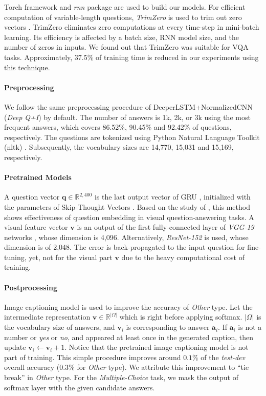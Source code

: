 \documentclass{article}
\newcommand{\vv}[0]{\mathbf{v}}
\newcommand{\vq}[0]{\mathbf{q}}
\newcommand{\va}[0]{\mathbf{a}}
\begin{document}
Torch framework and \textit{rnn} package \cite{Leonard2015a} are used to build our models. For efficient computation of variable-length questions, \textit{TrimZero} is used to trim out zero vectors \cite{Kim2016a}. TrimZero eliminates zero computations at every time-step in mini-batch learning. Its efficiency is affected by a batch size, RNN model size, and the number of zeros in inputs. We found out that TrimZero was suitable for VQA tasks. Approximately, 37.5\% of training time is reduced in our experiments using this technique.

\paragraph{Preprocessing} We follow the same preprocessing procedure of DeeperLSTM+NormalizedCNN \cite{Lu2015} (\textit{Deep Q+I}) by default. The number of answers is 1k, 2k, or 3k using the most frequent answers, which covers 86.52\%, 90.45\% and 92.42\% of questions, respectively. The questions are tokenized using Python Natural Language Toolkit (nltk) \cite{Bird2009}. Subsequently, the vocabulary sizes are 14,770, 15,031 and 15,169, respectively.


\paragraph{Pretrained Models}

A question vector $\vq \in \mathbb{R}^{2,400}$ is the last output vector of GRU \cite{Cho2014}, initialized with the parameters of Skip-Thought Vectors \cite{Kiros2015}. Based on the study of \citet{Noh2015}, this method shows effectiveness of question embedding in visual question-answering tasks. A visual feature vector $\vv$ is an output of the first fully-connected layer of \textit{VGG-19} networks \cite{Simonyan2015}, whose dimension is 4,096. Alternatively, \textit{ResNet-152} \cite{He2015} is used, whose dimension is of 2,048. The error is back-propagated to the input question for fine-tuning, yet, not for the visual part $\vv$ due to the heavy computational cost of training.

\paragraph{Postprocessing}

Image captioning model \cite{Karpathy} is used to improve the accuracy of \textit{Other} type. Let the intermediate representation $\vv \in \mathbb{R}^{|\Omega|}$ which is right before applying softmax. $|\Omega|$ is the vocabulary size of answers, and $\vv_i$ is corresponding to answer $\va_i$. If $\va_i$ is not a number or \textit{yes} or \textit{no}, and appeared at least once in the generated caption, then update $\vv_i \leftarrow \vv_i + 1$. Notice that the pretrained image captioning model is not part of training. This simple procedure improves around $0.1\%$ of the \textit{test-dev} overall accuracy ($0.3\%$ for \textit{Other} type). We attribute this improvement to ``tie break'' in \textit{Other} type. For the \textit{Multiple-Choice} task, we mask the output of softmax layer with the given candidate answers.
\end{document}

